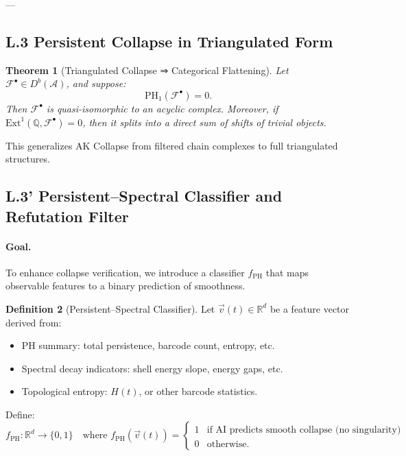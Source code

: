 \documentclass[11pt]{article}
\newtheorem{theorem}{Theorem}[section]
\theoremstyle{definition}
\newtheorem{definition}[theorem]{Definition}
\begin{document}
---

\subsection*{L.3 Persistent Collapse in Triangulated Form}

\begin{theorem}[Triangulated Collapse ⇒ Categorical Flattening]
Let \( \mathcal{F}^\bullet \in D^b(\mathcal{A}) \), and suppose:
\[
\mathrm{PH}_1(\mathcal{F}^\bullet) = 0.
\]
Then \( \mathcal{F}^\bullet \) is quasi-isomorphic to an acyclic complex.  
Moreover, if \( \mathrm{Ext}^1(\mathbb{Q}, \mathcal{F}^\bullet) = 0 \), then it splits into a direct sum of shifts of trivial objects.
\end{theorem}

This generalizes AK Collapse from filtered chain complexes to full triangulated structures.

\subsection*{L.3' Persistent–Spectral Classifier and Refutation Filter}

\paragraph{Goal.}
To enhance collapse verification, we introduce a classifier $f_{\mathrm{PH}}$ that maps observable features to a binary prediction of smoothness.

\begin{definition}[Persistent–Spectral Classifier]
Let $\vec{v}(t) \in \mathbb{R}^d$ be a feature vector derived from:
\begin{itemize}
  \item PH summary: total persistence, barcode count, entropy, etc.
  \item Spectral decay indicators: shell energy slope, energy gaps, etc.
  \item Topological entropy: $H(t)$, or other barcode statistics.
\end{itemize}
Define:
\[
f_{\mathrm{PH}} : \mathbb{R}^d \to \{0,1\}
\quad \text{where } f_{\mathrm{PH}}(\vec{v}(t)) = 
\begin{cases}
1 & \text{if AI predicts smooth collapse (no singularity)} \\
0 & \text{otherwise}.
\end{cases}
\]
\end{definition}
\end{document}
